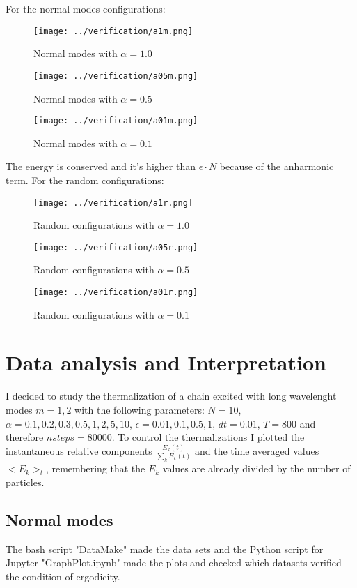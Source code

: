 \documentclass[10pt]{article}
\numberwithin{equation}{section}
\begin{document}
For the normal modes configurations:

\begin{figure}[!htb]
    \texttt{[image: ../verification/a1m.png]}
    \caption{Normal modes with $\alpha = 1.0$}
\endminipage \hfill
{}
    \texttt{[image: ../verification/a05m.png]}
    \caption{Normal modes with $\alpha = 0.5$}
\endminipage \hfill
{}
    \texttt{[image: ../verification/a01m.png]}
    \caption{Normal modes with $\alpha = 0.1$}
\endminipage 
\end{figure}

The energy is conserved and it's higher than $\epsilon \cdot N$ because of the anharmonic term. For the random configurations:

\begin{figure}[!htb]
    \texttt{[image: ../verification/a1r.png]}
    \caption{Random configurations with $\alpha = 1.0$}
\endminipage \hfill
{}
    \texttt{[image: ../verification/a05r.png]}
    \caption{Random configurations with $\alpha = 0.5$}
\endminipage \hfill
{}
    \texttt{[image: ../verification/a01r.png]}
    \caption{Random configurations with $\alpha = 0.1$}
\endminipage 
\end{figure}

\clearpage

\section{Data analysis and Interpretation}

I decided to study the thermalization of a chain excited with long wavelenght modes  $m=1,2$ with the following parameters: $N=10$, $\alpha = 0.1, 0.2, 0.3,0.5,1,2,5,10$, $\epsilon=0.01,0.1,0.5,1$, $dt=0.01$, $T=800$ and therefore $nsteps=80000$. To control the thermalizations I plotted the instantaneous relative components $\frac{E_k(t)}{\sum_k E_k (t)}$ and the time averaged values $<E_k>_t$, remembering that the $E_k$ values are already divided by the number of particles.

\subsection{Normal modes}

The bash script "DataMake" made the data sets and the Python script for Jupyter "GraphPlot.ipynb" made the plots and checked which datasets verified the condition of ergodicity.
\end{document}
